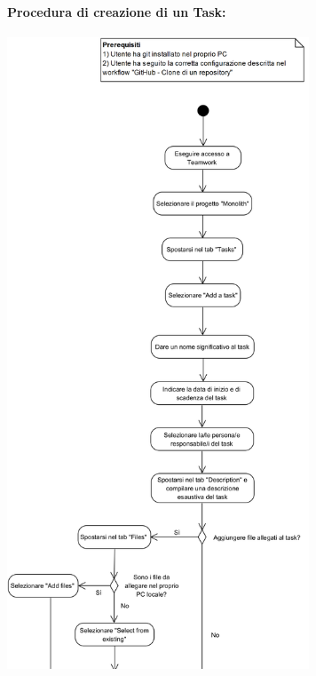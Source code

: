 \newpage
\paragraph{Procedura di creazione di un Task:}

\begin{center}
	\includegraphics[width=9cm]{./DiagrammiProcedure/CreazioneTask1.png}
\end{center}

